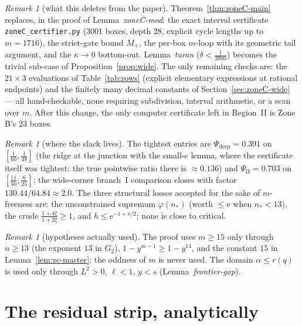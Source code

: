 \documentclass[11pt]{article}
\theoremstyle{remark}
\newtheorem{remark}[theorem]{Remark}
\theoremstyle{plain}
\theoremstyle{plain}
\newcommand{\eu}{\mathrm{e}}
\begin{document}
\begin{remark}[what this deletes from the paper]
Theorem~\ref{thm:zoneC-main} replaces, in the proof of Lemma~\emph{zoneC-mod}:
the exact interval certificate \texttt{zoneC\_certifier.py} ($3001$ boxes,
depth $28$, explicit cycle lengths up to $m=1716$), the strict-gate bound
$M_+$, the per-box $m$-loop with its geometric tail argument, and the
$\kappa\to0$ bottom-out.  Lemma~\emph{turan} ($\delta<\tfrac1{2000}$)
becomes the trivial sub-case of Proposition~\ref{prop:wide}.  The only
remaining checks are: the $21\times3$ evaluations of Table~\ref{tab:rows}
(explicit elementary expressions at rational endpoints) and the
finitely many decimal constants of Section~\ref{sec:zoneC-wide} — all
hand-checkable, none requiring subdivision, interval arithmetic, or a scan
over $m$.  After this change, the only computer certificate left in
Region~II is Zone B's $23$ boxes.
\end{remark}

\begin{remark}[where the slack lives]
The tightest entries are $\Psi_{\mathrm{deep}}=0.391$ on
$[\tfrac1{60},\tfrac1{48}]$ (the ridge at the junction with the small-$e$
lemma, where the certificate itself was tightest: the true pointwise ratio
there is $\approx0.136$) and $\Psi_{\mathrm{II}}=0.703$ on
$[\tfrac{11}{50},\tfrac6{25}]$; the wide-corner branch~I comparison closes
with factor $130.44/64.84\approx2.0$.  The three structural losses
accepted for the sake of $m$-freeness are: the unconstrained supremum
$\varphi(n_*)$ (worth $\le\eu$ when $n_*<13$), the crude
$\tfrac{1+4\xi}{1+2\xi}\ge1$, and $h\le\eu^{-1+v/2}$; none is close to
critical.
\end{remark}

\begin{remark}[hypotheses actually used]
The proof uses $m\ge15$ only through $n\ge13$ (the exponent $13$ in $G_2$),
$1-y^{m-1}\ge1-y^{14}$, and the constant $15$ in
Lemma~\ref{lem:zc-master}; the oddness of $m$ is never used.  The domain
$\alpha\le r(q)$ is used only through $L^2>0$, $\ell<1$, $y<s$
(Lemma~\emph{frontier-gap}).
\end{remark}

\section{The residual strip, analytically}\label{sec:strip}
\end{document}
